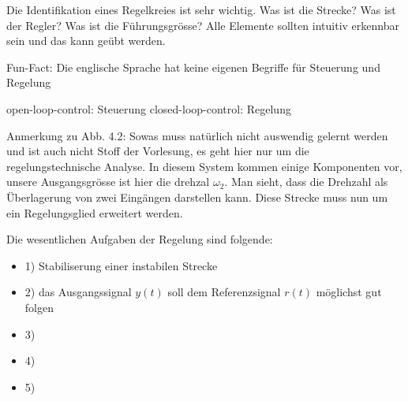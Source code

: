 \documentclass[a4paper]{article}
\begin{document}
Die Identifikation eines Regelkreies ist sehr wichtig. Was ist die Strecke? Was ist der Regler? Was ist die Führungsgrösse? Alle Elemente sollten intuitiv erkennbar sein und das kann geübt werden.

Fun-Fact: Die englische Sprache hat keine eigenen Begriffe für Steuerung und Regelung
\begin{iteimize}
    open-loop-control: Steuerung
    closed-loop-control: Regelung
\end{iteimize}

Anmerkung zu Abb. 4.2: Sowas muss natürlich nicht auswendig gelernt werden und ist auch nicht Stoff der Vorlesung, es geht hier nur um die regelungstechnische Analyse.
In diesem System kommen einige Komponenten vor, unsere Ausgangsgrösse ist hier die drehzal $\omega_{2}$. Man sieht, dass die Drehzahl als Überlagerung von zwei Eingängen darstellen kann. Diese Strecke muss nun um ein Regelungsglied erweitert werden.

Die wesentlichen Aufgaben der Regelung sind folgende:
\begin{itemize}
    \item 1) Stabiliserung einer instabilen Strecke
    \item 2) das Ausgangssignal $y(t)$ soll dem Referenzsignal $r(t)$ möglichst gut folgen
    \item 3) 
    \item 4)
\item 5)
\end{itemize}
\end{document}
